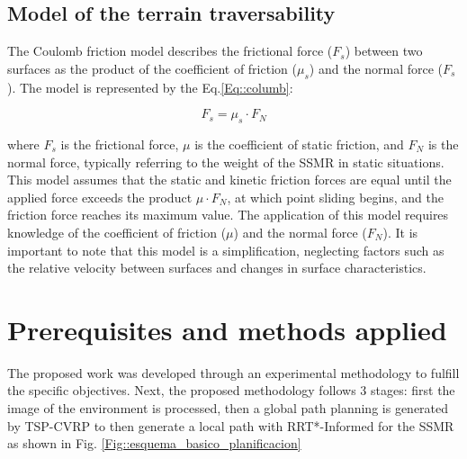 \documentclass[conference]{IEEEtran}
\begin{document}
\subsection{Model of the terrain traversability}
The Coulomb friction model \cite{Popov2017,Ding } describes the frictional force (\( F_{s} \)) between two surfaces as the product of the coefficient of friction ($\mu_{s}$) and the normal force (\( F_{s} \)). The model is represented by the Eq.\ref{Eq::columb}:

\begin{equation}
\label{Eq::columb}
 F_{s} = \mu_{s} \cdot F_{N} 
\end{equation}

\noindent where \( F_{s} \) is the frictional force, \( \mu \) is the coefficient of static friction, and \( F_{N} \) is the normal force, typically referring to the weight of the SSMR in static situations. This model assumes that the static and kinetic friction forces are equal until the applied force exceeds the product \( \mu \cdot F_{N} \), at which point sliding begins, and the friction force reaches its maximum value. The application of this model requires knowledge of the coefficient of friction (\( \mu \)) and the normal force (\( F_{N} \)). It is important to note that this model is a simplification, neglecting factors such as the relative velocity between surfaces and changes in surface characteristics.



\section{Prerequisites and methods applied}
\label{Sec::methdology}
The proposed work was developed through an experimental methodology to fulfill the specific objectives. Next, the proposed methodology follows 3 stages: first the image of the environment is processed, then a global path planning is generated by TSP-CVRP to then generate a local path with RRT*-Informed for the SSMR as shown in Fig. \ref{Fig::esquema_basico_planificacion}
\end{document}
